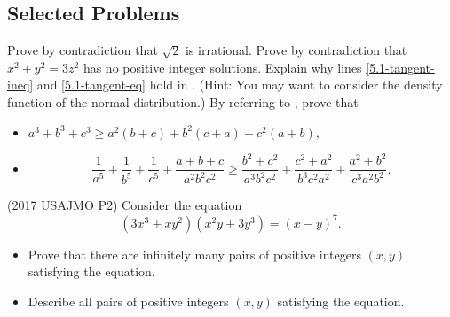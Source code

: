 \documentclass[../main.tex]{subfiles}
\begin{document}
\subsection{Selected Problems}
\problem Prove by contradiction that $\sqrt{2}$ is irrational.
\problem* Prove by contradiction that $x^2+y^2=3z^2$ has no positive integer solutions.
\problem Explain why lines \eqref{5.1-tangent-ineq} and \eqref{5.1-tangent-eq} hold in .
(Hint: You may want to consider the density function of the normal distribution.)
\problem By referring to , prove that
\begin{itemize}
    \item $a^3+b^3+c^3\geq a^2(b+c)+b^2(c+a)+c^2(a+b),$
    \item \[\frac{1}{a^5}+\frac{1}{b^5}+\frac{1}{c^5}+\frac{a+b+c}{a^2b^2c^2}\geq \frac{b^2+c^2}{a^3b^2c^2}+\frac{c^2+a^2}{b^3c^2a^2}+\frac{a^2+b^2}{c^3a^2b^2}.\]
\end{itemize}
\problem (2017 USAJMO P2) Consider the equation $$(3x^3+xy^2)(x^2y+3y^3)=(x-y)^7.$$
\begin{itemize}
    \item Prove that there are infinitely many pairs of positive integers $(x,y)$ satisfying the equation.
    \item Describe all pairs of positive integers $(x,y)$ satisfying the equation.
\end{itemize}
\end{document}
